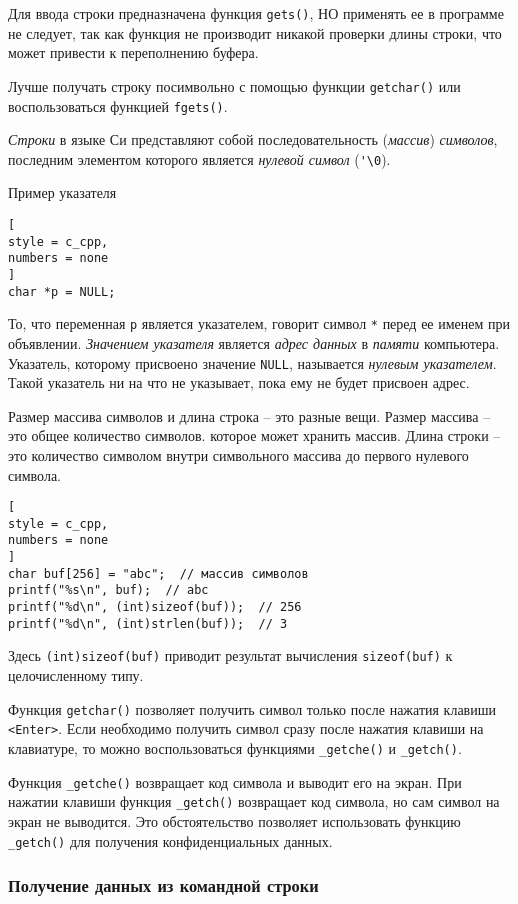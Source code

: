 \documentclass[%
	11pt,
	a4paper,
	utf8,
		]{article}
\begin{document}
Для ввода строки предназначена функция {\color{red}\verb*|gets()|, НО применять ее в программе не следует}, так как функция не производит никакой проверки длины строки, что может привести к переполнению буфера.

Лучше получать строку посимвольно с помощью функции \verb*|getchar()| или воспользоваться функцией \verb|fgets()|.

\emph{Строки} в языке Си представляют собой последовательность (\emph{массив}) \emph{символов}, последним элементом которого является \emph{нулевой символ} (\verb*|'\0|). 

Пример указателя
\begin{lstlisting}[
style = c_cpp,
numbers = none
]
char *p = NULL;
\end{lstlisting}

То, что переменная \verb|p| является указателем, говорит символ \verb*|*| перед ее именем при объявлении. \emph{Значением указателя} является \emph{адрес данных} в \emph{памяти} компьютера. Указатель, которому присвоено значение \verb|NULL|, называется \emph{нулевым указателем}. Такой указатель ни на что не указывает, пока ему не будет присвоен адрес.

Размер массива символов и длина строка -- это разные вещи. Размер массива -- это общее количество символов. которое может хранить массив. Длина строки -- это количество символом внутри символьного массива до первого нулевого символа.
\begin{lstlisting}[
style = c_cpp,
numbers = none
]
char buf[256] = "abc";  // массив символов
printf("%s\n", buf);  // abc
printf("%d\n", (int)sizeof(buf));  // 256
printf("%d\n", (int)strlen(buf));  // 3
\end{lstlisting}

Здесь \verb*|(int)sizeof(buf)| приводит результат вычисления \verb|sizeof(buf)| к целочисленному типу.

Функция \verb*|getchar()| позволяет получить символ только после нажатия клавиши \verb|<Enter>|. Если необходимо получить символ сразу после нажатия клавиши на клавиатуре, то можно воспользоваться функциями \verb*|_getche()| и \verb|_getch()|.

Функция \verb*|_getche()| возвращает код символа и выводит его на экран. При нажатии клавиши функция \verb|_getch()| возвращает код символа, но сам символ на экран не выводится. Это обстоятельство позволяет использовать функцию \verb*|_getch()| для получения конфиденциальных данных.

\subsubsection{Получение данных из командной строки}
\end{document}
